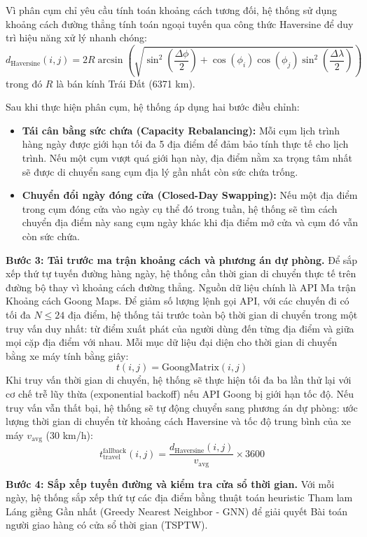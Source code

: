 \documentclass[a4paper,12pt]{report}
\begin{document}
Vì phân cụm chỉ yêu cầu tính toán khoảng cách tương đối, hệ thống sử dụng khoảng cách đường thẳng tính toán ngoại tuyến qua công thức Haversine để duy trì hiệu năng xử lý nhanh chóng:
\[
d_{\text{Haversine}}(i, j) = 2 R \arcsin \left( \sqrt{\sin^2\left(\frac{\Delta \phi}{2}\right) + \cos(\phi_i) \cos(\phi_j) \sin^2\left(\frac{\Delta \lambda}{2}\right)} \right)
\]
trong đó $R$ là bán kính Trái Đất (6371 km).

Sau khi thực hiện phân cụm, hệ thống áp dụng hai bước điều chỉnh:
\begin{itemize}
    \item \textbf{Tái cân bằng sức chứa (Capacity Rebalancing):} Mỗi cụm lịch trình hàng ngày được giới hạn tối đa 5 địa điểm để đảm bảo tính thực tế cho lịch trình. Nếu một cụm vượt quá giới hạn này, địa điểm nằm xa trọng tâm nhất sẽ được di chuyển sang cụm địa lý gần nhất còn sức chứa trống.
    \item \textbf{Chuyển đổi ngày đóng cửa (Closed-Day Swapping):} Nếu một địa điểm trong cụm đóng cửa vào ngày cụ thể đó trong tuần, hệ thống sẽ tìm cách chuyển địa điểm này sang cụm ngày khác khi địa điểm mở cửa và cụm đó vẫn còn sức chứa.
\end{itemize}

\textbf{Bước 3: Tải trước ma trận khoảng cách và phương án dự phòng.}
Để sắp xếp thứ tự tuyến đường hàng ngày, hệ thống cần thời gian di chuyển thực tế trên đường bộ thay vì khoảng cách đường thẳng. Nguồn dữ liệu chính là API Ma trận Khoảng cách Goong Maps. Để giảm số lượng lệnh gọi API, với các chuyến đi có tối đa $N \le 24$ địa điểm, hệ thống tải trước toàn bộ thời gian di chuyển trong một truy vấn duy nhất: từ điểm xuất phát của người dùng đến từng địa điểm và giữa mọi cặp địa điểm với nhau. Mỗi mục dữ liệu đại diện cho thời gian di chuyển bằng xe máy tính bằng giây:
\[
t(i, j) = \text{GoongMatrix}(i, j)
\]
Khi truy vấn thời gian di chuyển, hệ thống sẽ thực hiện tối đa ba lần thử lại với cơ chế trễ lũy thừa (exponential backoff) nếu API Goong bị giới hạn tốc độ. Nếu truy vấn vẫn thất bại, hệ thống sẽ tự động chuyển sang phương án dự phòng: ước lượng thời gian di chuyển từ khoảng cách Haversine và tốc độ trung bình của xe máy $v_{\text{avg}}$ (30 km/h):
\[
t_{\text{travel}}^{\text{fallback}}(i, j) = \frac{d_{\text{Haversine}}(i, j)}{v_{\text{avg}}} \times 3600
\]

\textbf{Bước 4: Sắp xếp tuyến đường và kiểm tra cửa sổ thời gian.}
Với mỗi ngày, hệ thống sắp xếp thứ tự các địa điểm bằng thuật toán heuristic Tham lam Láng giềng Gần nhất (Greedy Nearest Neighbor - GNN) để giải quyết Bài toán người giao hàng có cửa sổ thời gian (TSPTW).
\end{document}
